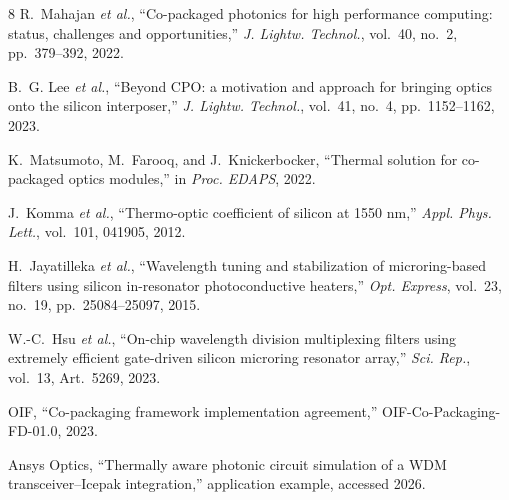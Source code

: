 \documentclass[conference]{IEEEtran}
\begin{document}
\begin{thebibliography}{8}
R.~Mahajan \textit{et al.}, ``Co-packaged photonics for high performance computing: status, challenges and opportunities,'' \textit{J. Lightw. Technol.}, vol.~40, no.~2, pp.~379--392, 2022.

B.~G. Lee \textit{et al.}, ``Beyond CPO: a motivation and approach for bringing optics onto the silicon interposer,'' \textit{J. Lightw. Technol.}, vol.~41, no.~4, pp.~1152--1162, 2023.

K.~Matsumoto, M.~Farooq, and J.~Knickerbocker, ``Thermal solution for co-packaged optics modules,'' in \textit{Proc. EDAPS}, 2022.

J.~Komma \textit{et al.}, ``Thermo-optic coefficient of silicon at 1550 nm,'' \textit{Appl. Phys. Lett.}, vol.~101, 041905, 2012.

H.~Jayatilleka \textit{et al.}, ``Wavelength tuning and stabilization of microring-based filters using silicon in-resonator photoconductive heaters,'' \textit{Opt. Express}, vol.~23, no.~19, pp.~25084--25097, 2015.

W.-C.~Hsu \textit{et al.}, ``On-chip wavelength division multiplexing filters using extremely efficient gate-driven silicon microring resonator array,'' \textit{Sci. Rep.}, vol.~13, Art.~5269, 2023.

OIF, ``Co-packaging framework implementation agreement,'' OIF-Co-Packaging-FD-01.0, 2023.

Ansys Optics, ``Thermally aware photonic circuit simulation of a WDM transceiver--Icepak integration,'' application example, accessed 2026.

\end{thebibliography}
\end{document}
